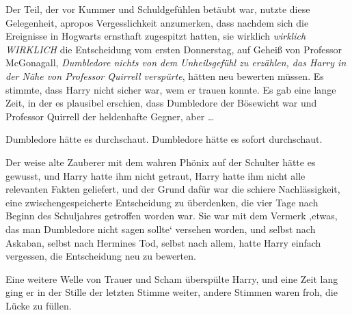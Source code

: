 Der Teil, der vor Kummer und Schuldgefühlen betäubt war, nutzte diese Gelegenheit, apropos Vergesslichkeit anzumerken, dass nachdem sich die Ereignisse in Hogwarts ernsthaft zugespitzt hatten, sie wirklich \emph{wirklich WIRKLICH} die Entscheidung vom ersten Donnerstag, auf Geheiß von Professor McGonagall, \emph{Dumbledore nichts von dem Unheilsgefühl zu erzählen, das Harry in der Nähe von Professor Quirrell verspürte}, hätten neu bewerten müssen. Es stimmte, dass Harry nicht sicher war, wem er trauen konnte. Es gab eine lange Zeit, in der es plausibel erschien, dass Dumbledore der Bösewicht war und Professor Quirrell der heldenhafte Gegner, aber …

Dumbledore hätte es durchschaut. Dumbledore hätte es sofort durchschaut.

Der weise alte Zauberer mit dem wahren Phönix auf der Schulter hätte es gewusst, und Harry hatte ihm nicht getraut, Harry hatte ihm nicht alle relevanten Fakten geliefert, und der Grund dafür war die schiere Nachlässigkeit, eine zwischengespeicherte Entscheidung zu überdenken, die vier Tage nach Beginn des Schuljahres getroffen worden war. Sie war mit dem Vermerk ‚etwas, das man Dumbledore nicht sagen sollte‘ versehen worden, und selbst nach Askaban, selbst nach Hermines Tod, selbst nach allem, hatte Harry einfach vergessen, die Entscheidung neu zu bewerten.

Eine weitere Welle von Trauer und Scham überspülte Harry, und eine Zeit lang ging er in der Stille der letzten Stimme weiter, andere Stimmen waren froh, die Lücke zu füllen.


